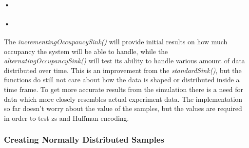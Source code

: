 \documentclass[a4paper, 12pt, openright, twoside]{report}
\begin{document}
\begin{minipage}{\linewidth}

\end{minipage}

\paragraph{•}
\begin{minipage}{\linewidth}

\end{minipage}


\paragraph{•} 
The \textit{incrementingOccupancySink()} will provide initial results on how much occupancy the system will be able to handle, while the \textit{alternatingOccupancySink()} will test its ability to handle various amount of data distributed over time.
This is an improvement from the \textit{standardSink()}, but the functions do still not care about how the data is shaped or distributed inside a time frame.
To get more accurate results from the simulation there is a need for data which more closely resembles actual experiment data.
The implementation so far doesn't worry about the value of the samples, but the values are required in order to test \gls{zs} and Huffman encoding.

\subsubsection{Creating Normally Distributed Samples}
\label{subsubsec:normal-distribution}
\end{document}
